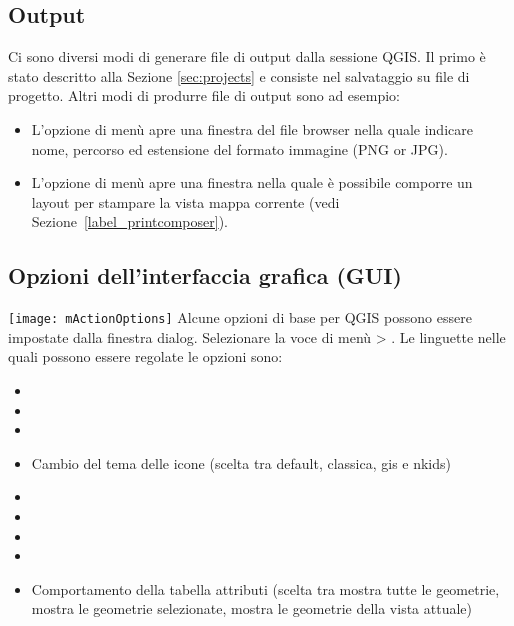 \subsection{Output}\label{sec:output}
Ci sono diversi modi di generare file di output dalla sessione QGIS.
Il primo è stato descritto alla Sezione \ref{sec:projects} e consiste nel
salvataggio su file di progetto. 
Altri modi di produrre file di output sono ad esempio:
\begin{itemize}
\item L'opzione di menù  apre una finestra del file browser nella quale indicare nome,
percorso ed estensione del formato immagine (PNG or JPG).
\item L'opzione di menù 
apre una finestra nella quale è possibile comporre un layout per stampare la
vista mappa corrente (vedi Sezione~\ref{label_printcomposer}).
\end{itemize}


\subsection{Opzioni dell'interfaccia grafica (GUI)}
\label{subsec:gui_options}
\texttt{[image: mActionOptions]} 
Alcune opzioni di base per QGIS possono essere impostate dalla finestra
 dialog. Selezionare la voce di menù  >
 . Le linguette nelle quali possono
 essere regolate le opzioni sono:


\begin{itemize}
\item {}
\item {}
\item {}
\item Cambio del tema delle icone (scelta tra default, classica, gis e nkids)
\item {}
\item {}
\item {}
\item {}
\item Comportamento della tabella attributi (scelta tra mostra tutte le
geometrie, mostra le geometrie selezionate, mostra le geometrie della vista
attuale)
\end{itemize}

